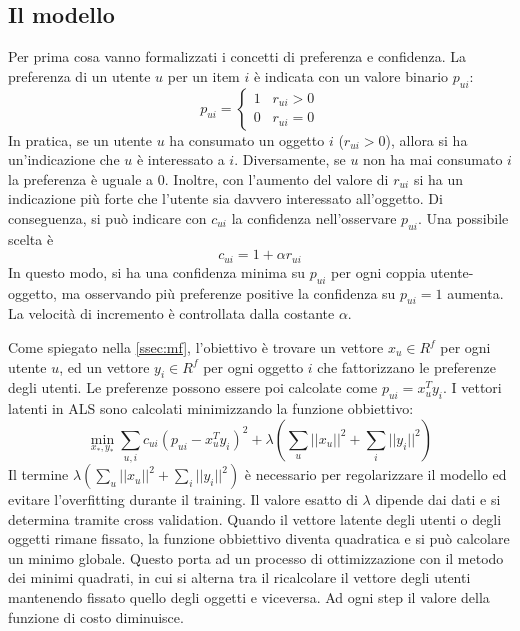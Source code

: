 \subsection{Il modello}
Per prima cosa vanno formalizzati i concetti di preferenza e confidenza. La preferenza di un utente $u$ per un item $i$ è indicata con un valore binario $p_{ui}$:
$$
p_{ui} =     \begin{cases}
				1 \;\;\; r_{ui} > 0 \\
				0 \;\;\; r_{ui} = 0
              \end{cases}
$$
In pratica, se un utente $u$ ha consumato un oggetto $i$ ($r_{ui} > 0$), allora si ha un'indicazione che $u$ è interessato a $i$. Diversamente, se $u$ non ha mai consumato $i$ la preferenza è uguale a 0. Inoltre, con l'aumento del valore di $r_{ui}$ si ha un indicazione più forte che l'utente sia davvero interessato all'oggetto. Di conseguenza, si può indicare con $c_{ui}$ la confidenza nell'osservare $p_{ui}$. Una possibile scelta è
$$
c_{ui} = 1 + \alpha r_{ui}
$$
In questo modo, si ha una confidenza minima su $p_{ui}$ per ogni coppia utente-oggetto, ma osservando più preferenze positive la confidenza su $p_{ui} = 1$ aumenta. La velocità di incremento è controllata dalla costante $\alpha$.

Come spiegato nella \autoref{ssec:mf}, l'obiettivo è trovare un vettore $x_u \in R^f$ per ogni utente $u$, ed un vettore $y_i \in R^f$ per ogni oggetto $i$ che fattorizzano le preferenze degli utenti. Le preferenze possono essere poi calcolate come $p_{ui} = x_u^Ty_i$. I vettori latenti in ALS sono calcolati minimizzando la funzione obbiettivo:	
$$
\min_{x_*,y_*} \sum_{u,i} c_{ui} (p_{ui} - x_u^Ty_i)^2 + 
\lambda \left( \sum_u ||x_u||^2 + \sum_i ||y_i||^2 \right)
$$
Il termine $\lambda \left( \sum_u ||x_u||^2 + \sum_i ||y_i||^2 \right)$ è necessario per regolarizzare il modello ed evitare l'overfitting durante il training. Il valore esatto di $\lambda$ dipende dai dati e si determina tramite cross validation. 
Quando il vettore latente degli utenti o degli oggetti rimane fissato, la funzione obbiettivo diventa quadratica e si può calcolare un minimo globale. Questo porta ad un processo di ottimizzazione con il metodo dei minimi quadrati, in cui si alterna tra il ricalcolare il vettore degli utenti mantenendo fissato quello degli oggetti e viceversa. Ad ogni step il valore della funzione di costo diminuisce.

